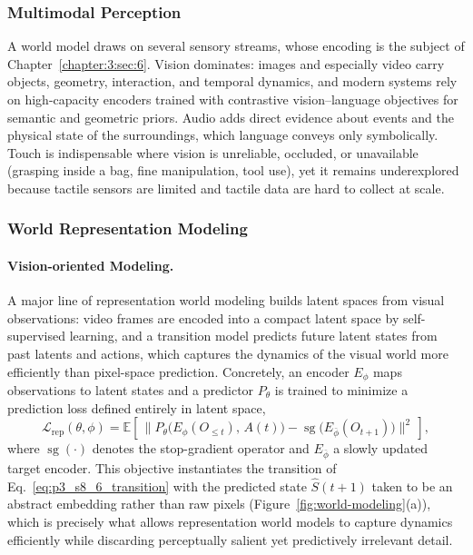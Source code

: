 \subsubsection{Multimodal Perception}

A world model draws on several sensory streams, whose encoding is the subject of Chapter~\ref{chapter:3:sec:6}. Vision dominates: images and especially video carry objects, geometry, interaction, and temporal dynamics, and modern systems rely on high-capacity encoders trained with contrastive vision--language objectives for semantic and geometric priors. Audio adds direct evidence about events and the physical state of the surroundings, which language conveys only symbolically. Touch is indispensable where vision is unreliable, occluded, or unavailable (grasping inside a bag, fine manipulation, tool use), yet it remains underexplored because tactile sensors are limited and tactile data are hard to collect at scale.




\subsubsection{World Representation Modeling}

\paragraph{Vision-oriented Modeling.}
A major line of representation world modeling builds latent spaces from visual observations: video frames are encoded into a compact latent space by self-supervised learning, and a transition model predicts future latent states from past latents and actions, which captures the dynamics of the visual world more efficiently than pixel-space prediction.
Concretely, an encoder $E_\phi$ maps observations to latent states and a predictor $P_\theta$ is trained to minimize a prediction loss defined entirely in latent space,
\begin{equation}
\label{eq:p3_s8_6_rep}
\mathcal{L}_{\text{rep}}(\theta,\phi) = \mathbb{E}\!\left[\,\big\lVert P_\theta\big(E_\phi(O_{\le t}),\, A(t)\big) - \operatorname{sg}\!\big(E_{\bar{\phi}}(O_{t+1})\big)\big\rVert^{2}\,\right],
\end{equation}
where $\operatorname{sg}(\cdot)$ denotes the stop-gradient operator and $E_{\bar{\phi}}$ a slowly updated target encoder.
This objective instantiates the transition of Eq.~\eqref{eq:p3_s8_6_transition} with the predicted state $\hat{S}(t+1)$ taken to be an abstract embedding rather than raw pixels (Figure~\ref{fig:world-modeling}(a)), which is precisely what allows representation world models to capture dynamics efficiently while discarding perceptually salient yet predictively irrelevant detail.



